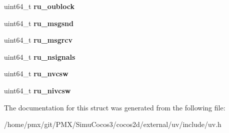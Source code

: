 \begin{DoxyCompactItemize}
\mbox{\label{structuv__rusage__t_aabd8151787f995f72acc234a46b8f1fb}} 
uint64\+\_\+t {\bfseries ru\+\_\+oublock}
\item 
\mbox{\label{structuv__rusage__t_ae83c349643cb1c6576ce66de28939ded}} 
uint64\+\_\+t {\bfseries ru\+\_\+msgsnd}
\item 
\mbox{\label{structuv__rusage__t_a08606567d4df9614f13667c8c733a604}} 
uint64\+\_\+t {\bfseries ru\+\_\+msgrcv}
\item 
\mbox{\label{structuv__rusage__t_a3f874562537c02bb4dd97549cd06e363}} 
uint64\+\_\+t {\bfseries ru\+\_\+nsignals}
\item 
\mbox{\label{structuv__rusage__t_afaae4a9ca17ef6608a92de0b5788e7b4}} 
uint64\+\_\+t {\bfseries ru\+\_\+nvcsw}
\item 
\mbox{\label{structuv__rusage__t_a7650f615b638bf4a29a08e5ed7f8f356}} 
uint64\+\_\+t {\bfseries ru\+\_\+nivcsw}
\end{DoxyCompactItemize}


The documentation for this struct was generated from the following file\+:\begin{DoxyCompactItemize}
\item 
/home/pmx/git/\+P\+M\+X/\+Simu\+Cocos3/cocos2d/external/uv/include/uv.\+h\end{DoxyCompactItemize}
